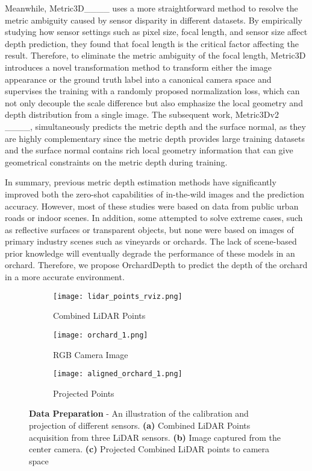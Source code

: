 Meanwhile, Metric3D____ uses a more straightforward method to resolve the metric ambiguity caused by sensor disparity in different datasets. By empirically studying how sensor settings such as pixel size, focal length, and sensor size affect depth prediction, they found that focal length is the critical factor affecting the result. Therefore, to eliminate the metric ambiguity of the focal length, Metric3D introduces a novel transformation method to transform either the image appearance or the ground truth label into a canonical camera space and supervises the training with a randomly proposed normalization loss, which can not only decouple the scale difference but also emphasize the local geometry and depth distribution from a single image. The subsequent work, Metric3Dv2 ____, simultaneously predicts the metric depth and the surface normal, as they are highly complementary since the metric depth provides large training datasets and the surface normal contains rich local geometry information that can give geometrical constraints on the metric depth during training.

In summary, previous metric depth estimation methods have significantly improved both the zero-shot capabilities of in-the-wild images and the prediction accuracy. However, most of these studies were based on data from public urban roads or indoor scenes. In addition, some attempted to solve extreme cases, such as reflective surfaces or transparent objects, but none were based on images of primary industry scenes such as vineyards or orchards. The lack of scene-based prior knowledge will eventually degrade the performance of these models in an orchard. Therefore, we propose OrchardDepth to predict the depth of the orchard in a more accurate environment.

    \begin{figure}[htbp]
         \centering
         \begin{subfigure}[t]{0.23\textwidth}
             \centering
             \texttt{[image: lidar\_points\_rviz.png]}
             \caption{Combined LiDAR Points}
             \label{fig:rviz lidar points}
         \end{subfigure}
         \hfill
         \begin{subfigure}[t]{0.23\textwidth}
             \centering
             \texttt{[image: orchard\_1.png]}
             \caption{RGB Camera Image}
             \label{fig:orchard scene 1}
         \end{subfigure}
         \hfill
         \begin{subfigure}[t]{0.23\textwidth}
             \centering
             \texttt{[image: aligned\_orchard\_1.png]}
             \caption{Projected Points}
             \label{fig:visual points in orchard 1}
         \end{subfigure}
            \caption{ \textbf{Data Preparation} - An illustration of the calibration and projection of different sensors. \textbf{(a)} Combined LiDAR Points acquisition from three LiDAR sensors. \textbf{(b)} Image captured from the center camera. \textbf{(c)} Projected Combined LiDAR points to camera space}
            \label{fig:Data Preparation Demostration}
    \end{figure}
    
